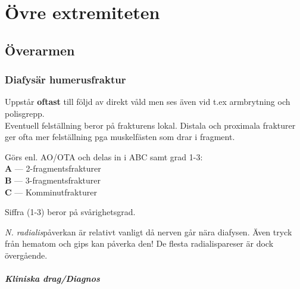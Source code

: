 \documentclass[
  letterpaper,
  DIV=11,
  numbers=noendperiod]{scrreport}
\let\oldparagraph\paragraph
\renewcommand{\paragraph}[1]{\oldparagraph{#1}\mbox{}}
\begin{document}
\hypertarget{uxf6vre-extremiteten}{%
\chapter{Övre extremiteten}\label{uxf6vre-extremiteten}}

\hypertarget{uxf6verarmen}{%
\section{Överarmen}\label{uxf6verarmen}}

\hypertarget{diafysuxe4r-humerusfraktur}{%
\subsection{Diafysär humerusfraktur}\label{diafysuxe4r-humerusfraktur}}

Uppstår \textbf{oftast} till följd av direkt våld men ses även vid t.ex
armbrytning och polisgrepp.\\
Eventuell felställning beror på frakturens lokal. Distala och proximala
frakturer ger ofta mer felställning pga muskelfästen som drar i
fragment.

\begin{tcolorbox}[enhanced jigsaw, colback=white, colbacktitle=quarto-callout-tip-color!10!white, toptitle=1mm, arc=.35mm, toprule=.15mm, rightrule=.15mm, titlerule=0mm, breakable, bottomrule=.15mm, colframe=quarto-callout-tip-color-frame, left=2mm, opacityback=0, coltitle=black, title=\textcolor{quarto-callout-tip-color}{\faLightbulb}\hspace{0.5em}{Klassifikation}, leftrule=.75mm, bottomtitle=1mm, opacitybacktitle=0.6]

Görs enl. AO/OTA och delas in i ABC samt grad 1-3:\\
\textbf{A} --- 2-fragmentsfrakturer\\
\textbf{B} --- 3-fragmentsfrakturer\\
\textbf{C} --- Komminutfrakturer

Siffra (1-3) beror på svårighetsgrad.

\end{tcolorbox}

\emph{N. radialis}påverkan är relativt vanligt då nerven går nära
diafysen. Även tryck från hematom och gips kan påverka den! De flesta
radialispareser är dock övergående.

\hypertarget{kliniska-dragdiagnos}{%
\paragraph{Kliniska drag/Diagnos}\label{kliniska-dragdiagnos}}
\end{document}

